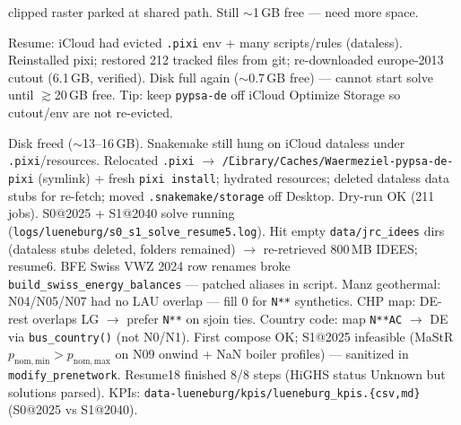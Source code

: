 \documentclass[11pt,a4paper]{article}
\begin{document}
\begin{description}[style=nextline,leftmargin=1.2cm]
        clipped raster parked at shared path. Still $\sim$1\,GB free --- need more space.
  \item[2026-11-12] Resume: iCloud had evicted \texttt{.pixi} env + many
        scripts/rules (dataless). Reinstalled pixi; restored 212 tracked files
        from git; re-downloaded europe-2013 cutout (6.1\,GB, verified).
        Disk full again ($\sim$0.7\,GB free) --- cannot start solve until
        $\gtrsim$20\,GB free. Tip: keep \texttt{pypsa-de} off iCloud Optimize
        Storage so cutout/env are not re-evicted.
  \item[2026-11-13] Disk freed ($\sim$13--16\,GB). Snakemake still hung on
        iCloud dataless under \texttt{.pixi}/resources. Relocated
        \texttt{.pixi} $\to$ \texttt{\~/Library/Caches/Waermeziel-pypsa-de-pixi}
        (symlink) + fresh \texttt{pixi install}; hydrated resources; deleted
        dataless data stubs for re-fetch; moved
        \texttt{.snakemake/storage} off Desktop. Dry-run OK (211 jobs).
        S0@2025 + S1@2040 solve running
        (\texttt{logs/lueneburg/s0\_s1\_solve\_resume5.log}).
        Hit empty \texttt{data/jrc\_idees} dirs (dataless stubs deleted,
        folders remained) $\to$ re-retrieved 800\,MB IDEES; resume6.
        BFE Swiss VWZ 2024 row renames broke
        \texttt{build\_swiss\_energy\_balances} --- patched aliases in script.
        Manz geothermal: N04/N05/N07 had no LAU overlap --- fill 0 for
        \texttt{N**} synthetics. CHP map: DE-rest overlaps LG $\to$ prefer
        \texttt{N**} on sjoin ties.         Country code: map \texttt{N**AC}
        $\to$ DE via \texttt{bus\_country()} (not N0/N1).
        First compose OK; S1@2025 infeasible (MaStR $p_\mathrm{nom,min}>p_\mathrm{nom,max}$
        on N09 onwind + NaN boiler profiles) --- sanitized in
        \texttt{modify\_prenetwork}. Resume18 finished 8/8 steps
        (HiGHS status Unknown but solutions parsed).
        KPIs: \texttt{data-lueneburg/kpis/lueneburg\_kpis.\{csv,md\}}
        (S0@2025 vs S1@2040).
\end{description}
\end{document}
